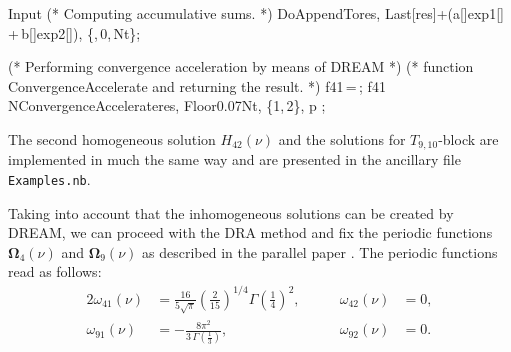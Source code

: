 \documentclass[sort&compress]{elsarticle}
\begin{document}
\begin{mmaCell}[moredefined={T4homo1, ConvergenceAccelerate},morepattern={o_Integer, p_Integer, p, o, \#1, \#},morelocal={n, res, a, b, exp1, exp2, sd1, sd2, Nt, C4, oc, f41, n_Integer, n_}]{Input}
	    (* Computing accumulative sums. *)
	    Do\pbl\vphantom{0}AppendTo\pbl\vphantom{0}res, Last[res]+(a[]exp1[]\,+\,b[]exp2[])\pbr,
	      \{,\,0,\,Nt\}\pbr;
	
	    (* Performing convergence acceleration by means of DREAM *)
	    (* function ConvergenceAccelerate and returning the result. *)
	    f41\,=\,;
	    f41\,N\pbl\vphantom{0}ConvergenceAccelerate\pbl\vphantom{0}res, Floor\pbl0.07Nt\pbr, \{1,\,2\}\pbr, p\pbr
	  \pbr;
\end{mmaCell}
The second homogeneous solution $H_{42}(\nu)$ and the solutions for $T_{9,10}$-block are implemented in much the same way and are presented in the ancillary file \texttt{Examples.nb}.

Taking into account that the inhomogeneous solutions can be created by DREAM,
we can proceed with the DRA method and fix the periodic functions $\bm{\Omega}_4(\nu)$ and $\bm{\Omega}_9(\nu)$ as described in the parallel paper \cite{LeeMingulov:Meromorphic}.
The periodic functions read as follows:
\begin{alignat}{2}
	\omega_{41}(\nu)&=\frac{16}{5 \sqrt{\pi }}\left(\frac{2}{15}\right)^{1/4} \Gamma \left(\tfrac{1}{4}\right)^2, \qquad & \omega_{42}(\nu)&=0, \\
	\omega_{91}(\nu)&=-\frac{8 \pi ^2}{3 \, \Gamma \left(\frac{1}{3}\right)}, & \omega_{92}(\nu)&=0.
\end{alignat}
\end{document}
